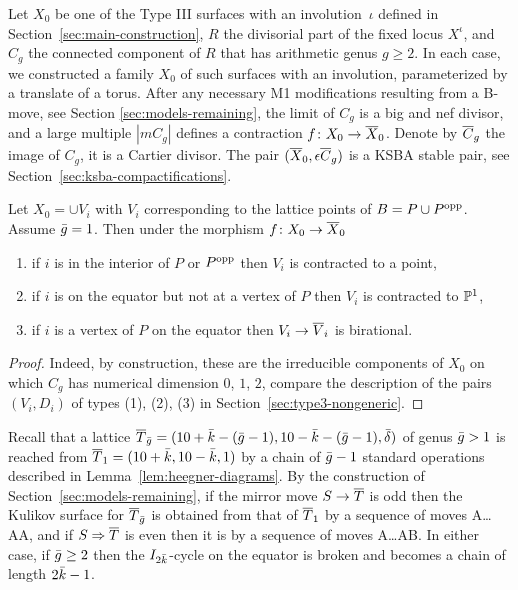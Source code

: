 \documentclass{amsart}
\begin{document}
Let $X_0$ be one of the Type III surfaces with an involution~$\iota$
defined in Section~\ref{sec:main-construction}, $R$ the divisorial
part of the fixed locus $X^\iota$, and $C_g$ the connected component
of $R$ that has arithmetic genus $g\ge2$. In each case, we constructed
a family $X_0$ of such surfaces with an involution,
parameterized by a translate of a torus. After any necessary M1 modifications
resulting from a B-move, see Section \ref{sec:models-remaining},
the limit of $C_g$ is a big and nef divisor, and a large multiple
$|mC_g|$ defines a contraction $f\colon X_0\to {\overline X}_0$. Denote by
${\overline C}_g$ the image of $C_g$, it is a Cartier divisor. The pair
$({\overline X}_0,\epsilon {\overline C}_g)$ is a KSBA stable pair, see
Section~\ref{sec:ksba-compactifications}.

\begin{lemma}\label{lem:contractions-to-stable-model}
  Let $X_0=\cup V_i$ with $V_i$ corresponding to the lattice points of
  $B=P\cup P^{\rm opp}$. Assume $\bar g=1$. Then under the morphism $f\colon
  X_0\to {\overline X}_0$
  \begin{enumerate}
  \item if $i$ is in the interior of $P$ or $P^{\rm opp}$ then $V_i$ is
    contracted to a point,
  \item if $i$ is on the equator but not at a vertex of $P$ then $V_i$
    is contracted to ${\mathbb P}^1$,
  \item if $i$ is a vertex of $P$ on the equator then $V_i\to{\overline V}_i$ is
    birational. 
  \end{enumerate}
\end{lemma}
\begin{proof}
  Indeed, by construction, these are the irreducible components of
  $X_0$ on which $C_g$ has numerical dimension $0$, $1$, $2$,
  compare the description of the pairs $(V_i,D_i)$ of types (1), (2), (3) in 
  Section~\ref{sec:type3-nongeneric}.
\end{proof}

Recall that a lattice
${\overline T}_{\bar g} = (10+\bar k-(\bar g-1), 10-\bar k-(\bar g-1),\bar \delta)$ of genus
$\bar g>1$ is reached from ${\overline T}_1= (10+\bar k, 10-\bar k, 1)$ by a chain of
$\bar g-1$ standard operations described in
Lemma~\ref{lem:heegner-diagrams}. By the construction of
Section~\ref{sec:models-remaining}, if the mirror move $S\to{\overline T}$
is odd then the Kulikov surface for ${\overline T}_{\bar g}$ is obtained from that
of ${\overline T}_1$ by a sequence of moves A{\dots}AA, and if $S\Rightarrow {\overline T}$ is even
then it is by a sequence of moves A{\dots}AB. 
In either case, if $\bar g\ge2$ then the $I_{2\bar k}$-cycle on the equator
is broken and becomes a chain of length $2\bar k-1$. 
\end{document}
